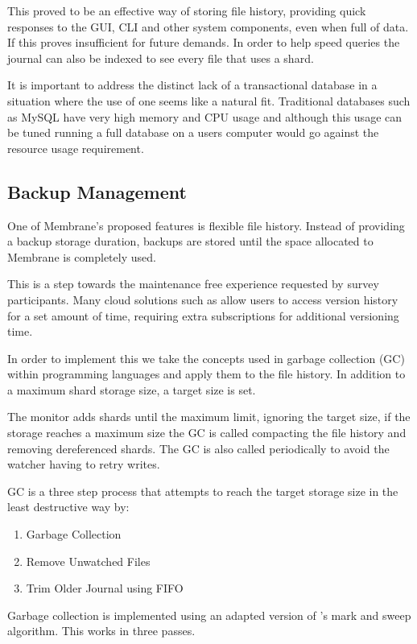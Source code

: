 \documentclass[11pt, a4paper, twoside]{report}
\begin{document}
This proved to be an effective way of storing file history, providing quick responses to the GUI, CLI and other system components, even when full of data. If this proves insufficient for future demands. In order to help speed queries the journal can also be indexed to see every file that uses a shard.

It is important to address the distinct lack of a transactional database in a situation where the use of one seems like a natural fit. Traditional databases such as MySQL have very high memory and CPU usage \citep{james2017sql} and although this usage can be tuned running a full database on a users computer would go against the resource usage requirement.

\subsection{Backup Management}

One of Membrane's proposed features is flexible file history. Instead of providing a backup storage duration, backups are stored until the space allocated to Membrane is completely used.

This is a step towards the maintenance free experience requested by survey participants. Many cloud solutions such as \cite{dropbox2017versions} allow users to access version history for a set amount of time, requiring extra subscriptions for additional versioning time.

In order to implement this we take the concepts used in garbage collection (GC) within programming languages and apply them to the file history. In addition to a maximum shard storage size, a target size is set.

The monitor adds shards until the maximum limit, ignoring the target size, if the storage reaches a maximum size the GC is called compacting the file history and removing dereferenced shards. The GC is also called periodically to avoid the watcher having to retry writes.

GC is a three step process that attempts to reach the target storage size in the least destructive way by:

\begin{enumerate}
 \item Garbage Collection
 \item Remove Unwatched Files
 \item Trim Older Journal using FIFO
\end{enumerate}

Garbage collection is implemented using an adapted version of \cite{dijkstra1978fly}'s mark and sweep algorithm. This works in three passes. 
\end{document}
